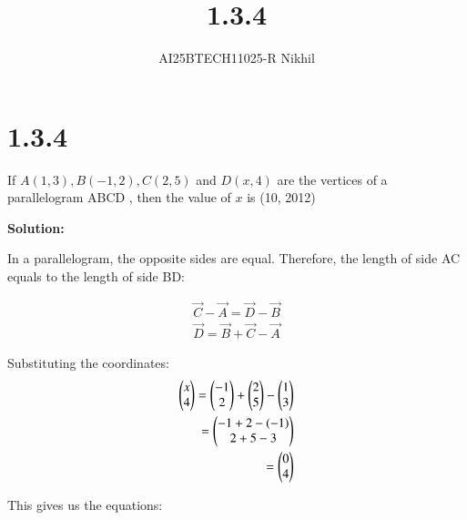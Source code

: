 \documentclass[journal]{IEEEtran}
\begin{document}

\vspace{3cm}

\title{1.3.4}
\author{AI25BTECH11025-R Nikhil}
 \maketitle
{\let\newpage\relax\maketitle}

\renewcommand{\thefigure}{\theenumi}
\renewcommand{\thetable}{\theenumi}
\setlength{\intextsep}{10pt} %


\renewcommand{\thetable}{\theenumi}


\section*{1.3.4}
If $ A(1, 3), B(-1, 2), C(2, 5) $ and $ D(x, 4) $ are the vertices of a parallelogram  ABCD , then the value of $x$ is \underline{\hspace{2cm}}(10, 2012)

\vspace{1em}
\textbf{Solution:}

In a parallelogram, the opposite sides are equal. Therefore, the length of side AC equals to the length of side BD:

\begin{align}
\vec{C} - \vec{A} = \vec{D} - \vec{B} \\
\vec{D} = \vec{B} + \vec{C} - \vec{A}
\end{align}


Substituting the coordinates:
\begin{align}
\begin{pmatrix} x \\ 4 \end{pmatrix} = \begin{pmatrix} -1 \\ 2 \end{pmatrix} + \begin{pmatrix} 2 \\ 5 \end{pmatrix} - \begin{pmatrix} 1 \\ 3 \end{pmatrix} \\
                 = \begin{pmatrix} -1 + 2 - (-1) \\ 2 + 5 - 3 \end{pmatrix} \\
                 = \begin{pmatrix} 0 \\ 4 \end{pmatrix}
\end{align}

This gives us the equations: 
\end{document}
